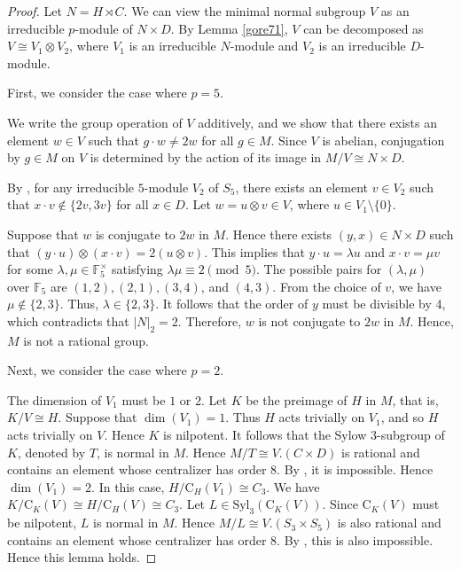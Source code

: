 \documentclass[11pt]{article}
\providecommand{\Syl}{{\mathrm{Syl}}}
\providecommand{\C}{{\mathrm{C}}}
\begin{document}
\begin{proof}
    Let $N = H \rtimes C$. 
    We can view the minimal normal subgroup $V$ as an irreducible $p$-module of $N\times D$. 
    By Lemma \ref{gore71}, $V$ can be decomposed as $V \cong V_1 \otimes V_2$, 
    where $V_1$ is an irreducible $N$-module and $V_2$ is an irreducible $D$-module.

	    First, we consider the case where $p=5$.
    
    We write the group operation of $V$ additively, 
    and we show that there exists an element $w \in V$ such that $g \cdot w \neq 2w$ for all $g \in M$. 
    Since $V$ is abelian, 
    conjugation by $g \in M$ on $V$ is determined by the action of its image in $M/V \cong N \times D$.

    By \cite[Code 18]{Git}, for any irreducible $5$-module $V_2$ of $S_5$,
    there exists an element $v \in V_2$ such that $x \cdot v \notin \{2v, 3v\}$ for all $x \in D$. 
    Let $w = u \otimes v \in V$, where $u \in V_1 \setminus \{0\}$.

    Suppose that $w$ is conjugate to $2w$ in $M$. 
    Hence there exists $(y, x) \in N \times D$ such that $(y \cdot u) \otimes (x \cdot v) = 2(u \otimes v)$. 
    This implies that $y \cdot u = \lambda u$ and $x \cdot v = \mu v$ 
    for some $\lambda, \mu \in \mathbb{F}_5^\times$ satisfying $\lambda \mu \equiv 2 \pmod 5$. 
    The possible pairs for $(\lambda, \mu)$ over $\mathbb{F}_5$ are $(1, 2), (2, 1), (3, 4)$, and $(4, 3)$. 
    From the choice of $v$, we have $\mu \notin \{2, 3\}$. 
    Thus, $\lambda \in \{2, 3\}$. 
    It follows that the order of $y$ must be divisible by 4, which contradicts that $|N|_2 = 2$. 
    Therefore, $w$ is not conjugate to $2w$ in $M$. Hence, $M$ is not a rational group.

    Next, we consider the case where $p=2$.

	    The dimension of $V_1$ must be $1$ or $2$.
    Let $K$ be the preimage of $H$ in $M$, that is, $K/V\cong H$.
    Suppose that $\dim(V_1)=1$. 
    Thus $H$ acts trivially on $V_1$, and so $H$ acts trivially on $V$.
    Hence $K$ is nilpotent.
    It follows that the Sylow $3$-subgroup of $K$, denoted by $T$,
    is normal in $M$.
    Hence $M/T\cong V.(C\times D)$ is rational and contains an element whose centralizer has order $8$.
    By \cite[Code 18]{Git}, it is impossible.
    Hence $\dim(V_1)=2$.
    In this case, $H/\C_{H}(V_1)\cong C_3$.
    We have $K/\C_K(V)\cong H/\C_{H}(V)\cong C_3$.
	    Let $L\in \Syl_3(\C_K(V))$.
    Since $\C_{K}(V)$ must be nilpotent, $L$ is normal in $M$.
    Hence $M/L\cong V.(S_3\times S_5)$ is also rational and contains an element whose centralizer has order $8$.
	    By \cite[Code 18]{Git}, this is also impossible.
    Hence this lemma holds.
\end{proof}
\end{document}
